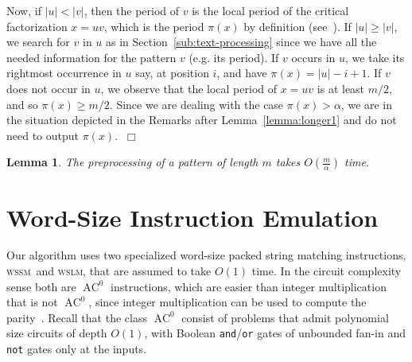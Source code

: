 \documentclass[12pt]{article}
\newtheorem{lemma}[theorem]{Lemma}
\newenvironment{proof}{\noindent{\bf Proof.\/}}{$~\Box$ \newline}
\newcommand{\comment}[1]{}
\newcommand{\W}{{\omega}}
\newcommand{\C}{{\alpha}}
\newcommand{\wssm}{\textsc{wssm}}
\newcommand{\wslm}{\textsc{wslm}}
\begin{document}
{\begin{proof}
  Now, if $|u| < |v|$, then the period of $v$ is the local period of
  the critical factorization $x=uv$, which is the period $\pi(x)$ by
  definition (see~\cite{cp:91}). If $|u| \geq |v|$, we search for $v$
  in $u$ as in Section~\ref{sub:text-processing} since we have all the
  needed information for the pattern $v$ (e.g.\mbox{} its period). If
  $v$ occurs in $u$, we take its rightmost occurrence in $u$ say, at
  position $i$, and have $\pi(x) = |u|-i+1$. If $v$ does not occur in
  $u$, we observe that the local period of $x=uv$ is at least $m/2$,
  and so $\pi(x) \geq m/2$. Since we are dealing with the case $\pi(x)
  > \C$, we are in the situation depicted in the Remarks after
  Lemma~\ref{lemma:longer1} and do not need to output $\pi(x)$. 
\end{proof}
}

\begin{lemma}
  \label{lem:pat_pre}
  The  preprocessing of a pattern of length $m$ takes $O(\frac{m}{\C})$ time.
\end{lemma}








\section{Word-Size Instruction Emulation}
\label{sec:word-size-string-matching}

Our algorithm %
uses two specialized word-size packed string matching instructions, \wssm\ and \wslm,
that are assumed to take $O(1)$ time. 
In the circuit complexity sense
both are $\mathop{AC}^0$ instructions,
which are easier than integer multiplication
that is not $\mathop{AC}^0$, since integer multiplication 
can be used to compute the parity~\cite{fss:84}.
Recall that the class $\mathop{AC}^0$ consist of problems that
  admit polynomial size circuits of depth $O(1)$, with Boolean
  \texttt{and}/\texttt{or} gates of unbounded fan-in and \texttt{not}
  gates only at the inputs.

\comment{ This proposition is stated above
\begin{lemma}
  \label{lemma:ac0}
  The $\W$-bit \wssm\ and \wslm\ problems
  belong to $\mathop{AC}^0$, the class of problems which
  admit circuits of depth $O(1)$ and polynomial size, with
  \texttt{and}/\texttt{or} gates of unbounded fan-in and \texttt{not}
  gates only at the inputs.
\end{lemma}
}
\end{document}
